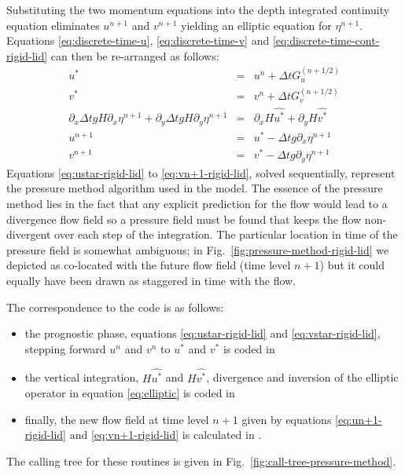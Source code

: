 Substituting the two momentum equations into the depth integrated
continuity equation eliminates $u^{n+1}$ and $v^{n+1}$ yielding an
elliptic equation for $\eta^{n+1}$. Equations
\ref{eq:discrete-time-u}, \ref{eq:discrete-time-v} and
\ref{eq:discrete-time-cont-rigid-lid} can then be re-arranged as follows:
\begin{eqnarray}
u^{*} & = & u^{n} + \Delta t G_u^{(n+1/2)} \label{eq:ustar-rigid-lid} \\
v^{*} & = & v^{n} + \Delta t G_v^{(n+1/2)} \label{eq:vstar-rigid-lid} \\
  \partial_x \Delta t g H \partial_x \eta^{n+1}
+ \partial_y \Delta t g H \partial_y \eta^{n+1}
& = &
  \partial_x H \widehat{u^{*}}
+ \partial_y H \widehat{v^{*}} \label{eq:elliptic}
\\
u^{n+1} & = & u^{*} - \Delta t g \partial_x \eta^{n+1} \label{eq:un+1-rigid-lid}\\
v^{n+1} & = & v^{*} - \Delta t g \partial_y \eta^{n+1} \label{eq:vn+1-rigid-lid}
\end{eqnarray}
Equations \ref{eq:ustar-rigid-lid} to \ref{eq:vn+1-rigid-lid}, solved
sequentially, represent the pressure method algorithm used in the
model. The essence of the pressure method lies in the fact that any
explicit prediction for the flow would lead to a divergence flow field
so a pressure field must be found that keeps the flow non-divergent
over each step of the integration. The particular location in time of
the pressure field is somewhat ambiguous; in
Fig.~\ref{fig:pressure-method-rigid-lid} we depicted as co-located
with the future flow field (time level $n+1$) but it could equally
have been drawn as staggered in time with the flow.

The correspondence to the code is as follows:
\begin{itemize}
\item
the prognostic phase, equations \ref{eq:ustar-rigid-lid} and \ref{eq:vstar-rigid-lid},
stepping forward $u^n$ and $v^n$ to $u^{*}$ and $v^{*}$ is coded in
\item
the vertical integration, $H \widehat{u^*}$ and $H
\widehat{v^*}$, divergence and inversion of the elliptic operator in
equation \ref{eq:elliptic} is coded in 
\item
finally, the new flow field at time level $n+1$ given by equations
\ref{eq:un+1-rigid-lid} and \ref{eq:vn+1-rigid-lid} is calculated in 
.
\end{itemize}
The calling tree for these routines is given in
Fig.~\ref{fig:call-tree-pressure-method}.


